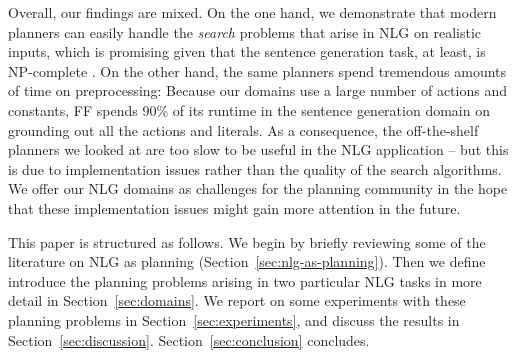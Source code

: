 Overall, our findings are mixed. On the one hand, we demonstrate that
modern planners can easily handle the \emph{search} problems that
arise in NLG on realistic inputs, which is promising given that the
sentence generation task, at least, is NP-complete
\citep{KolStr02}. On the other hand, the same planners spend
tremendous amounts of time on preprocessing: Because our domains use a
large number of actions and constants, FF spends 90\% of its runtime
in the sentence generation domain on grounding out all the actions and
literals. As a consequence, the off-the-shelf planners we looked at
are too slow to be useful in the NLG application -- but this is due to
implementation issues rather than the quality of the search
algorithms. We offer our NLG domains as challenges for the planning
community in the hope that these implementation issues might gain more
attention in the future.

This paper is structured as follows. We begin by briefly reviewing
some of the literature on NLG as planning
(Section~\ref{sec:nlg-as-planning}). Then we define introduce the
planning problems arising in two particular NLG tasks in more detail
in Section~\ref{sec:domains}. We report on some experiments with these
planning problems in Section~\ref{sec:experiments}, and discuss the
results in Section~\ref{sec:discussion}. Section~\ref{sec:conclusion}
concludes.



